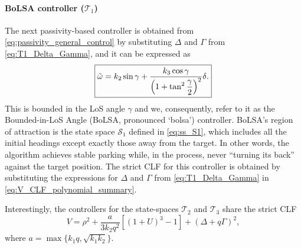 \documentclass[journal,twoside,web]{ieeecolor}
\theoremstyle{definition}
\begin{document}
\paragraph{BoLSA controller ($\mathcal{T}_1$)} The next passivity-based controller is obtained from \eqref{eq:passivity_general_control} by substituting $\Delta$ and $\Gamma$ from \eqref{eq:T1_Delta_Gamma}, and it can be expressed as
\begin{equation}
\label{eq-control-bounded-in-gamma}
\fbox{$\tilde\omega =  k_2\sin\gamma +  \displaystyle
\frac{k_3\cos\gamma}{\left(1+\displaystyle\tan^2\frac{\gamma}{2}\right)^2}\delta$.} 
\end{equation}
This is bounded in the LoS angle $\gamma$ and we, consequently, refer to it as the Bounded-in-LoS Angle (BoLSA, pronounced `bolsa') controller. BoLSA's region of attraction is the state space 
$\mathcal{S}_1$ defined in \eqref{eq:ss_S1},
which includes all the initial headings except  exactly those away from the target. In other words, the algorithm achieves stable parking while, in the process, never ``turning its back'' against the target position. 
The strict CLF for this controller is obtained by substituting the expressions for $\Delta$ and $\Gamma$ from \eqref{eq:T1_Delta_Gamma} in \eqref{eq:V_CLF_polynomial_summary}.

Interestingly, the controllers for the state-spaces $\mathcal{T}_2$ and $\mathcal{T}_3$ share the strict CLF 
\begin{equation}
\label{eq:CLF_ABounD_summary}
V = \rho^2 + \frac{a}{3k_2 q^2} \left[ (1+U)^3 -1\right] + 
\left (\Delta + q \Gamma \right)^2,
\end{equation}
where $a = \max\{k_1 q,   \sqrt{k_1 k_2}\}$.
\end{document}
